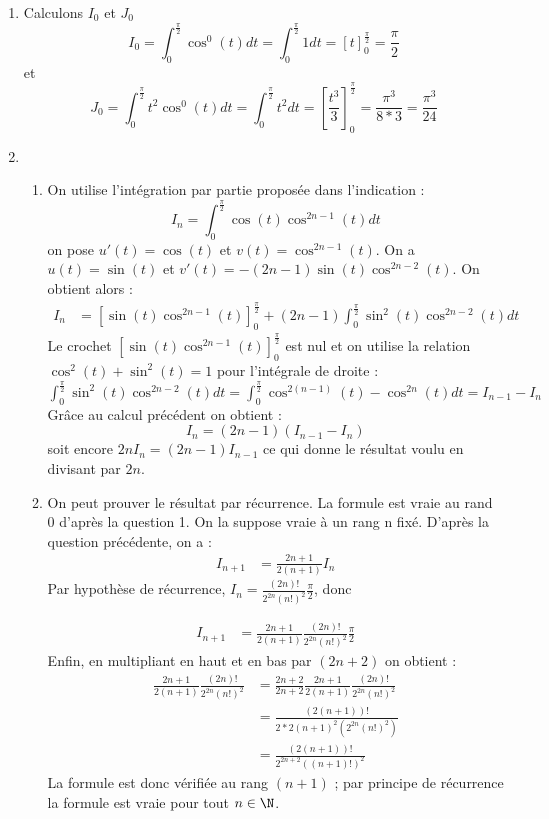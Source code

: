 \documentclass[a4paper, 11pt,reqno]{article}
\begin{document}
\begin{correction}
\begin{enumerate}
\item Calculons $I_0$ et $J_0$
 $$I_0  = \int_0^{\frac{\pi}{2}} \cos^{0}(t) dt = \int_0^{\frac{\pi}{2}} 1dt= \left[t \right]_0^{\frac{\pi}{2}} =\frac{\pi}{2}$$
et 
 $$J_0  = \int_0^{\frac{\pi}{2}} t^2\cos^{0}(t) dt = \int_0^{\frac{\pi}{2}} t^2dt= \left[\frac{t^3}{3} \right]_0^{\frac{\pi}{2}} =\frac{\pi^3}{8*3}=\frac{\pi^3}{24}$$
\item 
\begin{enumerate}
\item 

On utilise l'intégration par partie proposée dans l'indication : 
$$I_n  =  \int_0^{\frac{\pi}{2}}  \cos(t) \cos^{2n-1} (t) dt $$
on pose $u'(t)= \cos(t) $ et $v(t) =\cos^{2n-1}(t)$. On a $u(t)= \sin(t)$ et $v'(t) = -(2n-1) \sin(t) \cos^{2n-2}(t)$. On obtient alors : 
\begin{align*}
I_n &= \left[ \sin(t) \cos^{2n-1}(t)\right]_0^{\frac{\pi}{2}}  +(2n-1) \int_0^{\frac{\pi}{2}}  \sin^2(t) \cos^{2n-2} (t)dt
\end{align*}
Le crochet $\left[ \sin(t) \cos^{2n-1}(t)\right]_0^{\frac{\pi}{2}}$ est nul et on utilise la relation $\cos^2(t) + \sin^2(t) =1$ pour l'intégrale de droite : 
$\int_0^{\frac{\pi}{2}}  \sin^2(t) \cos^{2n-2} (t)dt =  \int_0^{\frac{\pi}{2}}  \cos^{2(n-1)} (t)- \cos^{2n}(t)dt = I_{n-1} -I_n$
Grâce au calcul précédent on obtient : 
$$I_n = (2n-1)(I_{n-1} -I_n)$$ 
soit encore $2nI_n = (2n-1) I_{n-1}$ ce qui donne le résultat voulu en divisant par $2n$. 

\item On peut prouver le résultat par récurrence.  La formule est vraie au rand 0 d'après la question 1. On la suppose vraie à un rang n fixé. D'après la question précédente, on a : 
\begin{align*}
I_{n+1} &= \frac{2n+1}{2(n+1)} I_{n}
\end{align*}
Par hypothèse de récurrence,  $I_n =  \frac{(2n)! }{2^{2n} (n!)^2} \frac{\pi}{2}$, donc 

\begin{align*}
I_{n+1} &= \frac{2n+1}{2(n+1)} \frac{(2n)! }{2^{2n} (n!)^2} \frac{\pi}{2}
\end{align*}
Enfin, en multipliant en haut et en bas par $(2n+2)$ on obtient : 
\begin{align*}
\frac{2n+1}{2(n+1)} \frac{(2n)! }{2^{2n} (n!)^2}  &=  \frac{2n+2}{2n+2}\frac{2n+1}{2(n+1)} \frac{(2n)! }{2^{2n} (n!)^2} \\
&= \frac{(2(n+1))!}{ 2*2 (n+1)^2 (2^{2n} (n!)^2)}\\
&= \frac{(2(n+1))!}{ 2^{2n+2} ((n+1)!)^2}
\end{align*}
La formule est donc vérifiée au rang $(n+1)$ ; par principe de récurrence la formule est vraie pour tout $n\in \N$. 


\end{enumerate}
\end{enumerate}
\end{correction}
\end{document}
